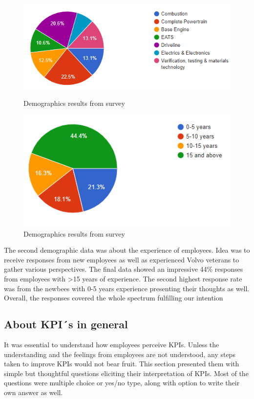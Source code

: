 \begin{figure}[H]
  \centering
  \begin{minipage}[b]{0.5\textwidth}
    \includegraphics[width=\textwidth]{figure/auxiliary/fig55a.PNG}
    \caption{Demographics results from survey}
    \label{fig:5.5a}
  \end{minipage}
  \hfill
  \begin{minipage}[b]{0.4\textwidth}
    \includegraphics[width=\textwidth]{figure/auxiliary/fig55b.PNG}
    \caption{Demographics results from survey}
    \label{fig:5.5b}
  \end{minipage}
\end{figure}
The second demographic data was about the experience of employees. Idea was to receive responses from new employees as well as experienced Volvo veterans to gather various perspectives. The final data showed an impressive 44\% responses from employees with >15 years of experience. The second highest response rate was from the newbees with 0-5 years experience presenting their thoughts as well. Overall, the responses covered the whole spectrum fulfilling our intention\\

\subsection{About KPI´s in general}
It was essential to understand how employees perceive KPIs. Unless the understanding and the feelings from employees are not understood, any steps taken to improve KPIs would not bear fruit. This section presented them with simple but thoughtful questions eliciting their interpretation of KPIs. Most of the questions were multiple choice or yes/no type, along with option to write their own answer as well. \\

